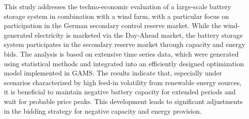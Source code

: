 This study addresses the techno-economic evaluation of a large-scale battery storage system
in combination with a wind farm, with a particular focus on participation in the German
secondary control reserve market. While the wind-generated electricity is marketed via the Day-Ahead market,
the battery storage system participates in the secondary reserve market through
capacity and energy bids. The analysis is based on extensive time series data,
which were generated using statistical methods and integrated into
an efficiently designed optimization model implemented in GAMS.
The results indicate that, especially under scenarios characterized by high feed-in volatility
from renewable energy sources, it is beneficial to maintain negative battery capacity
for extended periods and wait for probable price peaks.
This development leads to significant adjustments
in the bidding strategy for negative capacity and energy provision.
